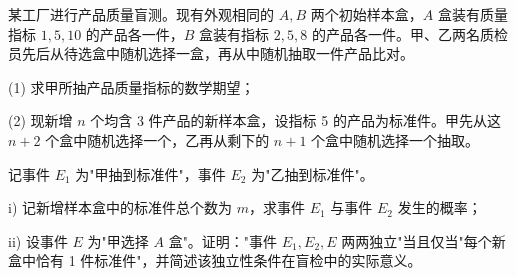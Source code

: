 \documentclass[lang=cn,11pt]{elegantbook}
\begin{document}
\begin{exercise}[提高]\label{exer:1-57}
某工厂进行产品质量盲测。现有外观相同的 \(A,B\) 两个初始样本盒，\(A\) 盒装有质量指标 \(1,5,10\) 的产品各一件，\(B\) 盒装有指标 \(2,5,8\) 的产品各一件。甲、乙两名质检员先后从待选盒中随机选择一盒，再从中随机抽取一件产品比对。\par
(1) 求甲所抽产品质量指标的数学期望；\par
(2) 现新增 \(n\) 个均含 3 件产品的新样本盒，设指标 5 的产品为标准件。甲先从这 \(n+2\) 个盒中随机选择一个，乙再从剩下的 \(n+1\) 个盒中随机选择一个抽取。\par
记事件 \(E_1\) 为"甲抽到标准件"，事件 \(E_2\) 为"乙抽到标准件"。\par
i) 记新增样本盒中的标准件总个数为 \(m\)，求事件 \(E_1\) 与事件 \(E_2\) 发生的概率；\par
ii) 设事件 \(E\) 为"甲选择 \(A\) 盒"。证明："事件 \(E_1,E_2,E\) 两两独立"当且仅当"每个新盒中恰有 1 件标准件"，并简述该独立性条件在盲检中的实际意义。
\end{exercise}
\end{document}
